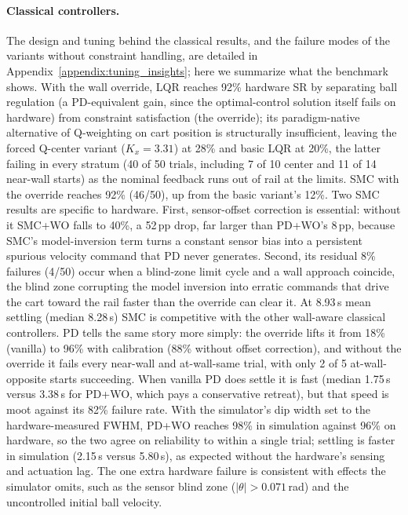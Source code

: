 \paragraph{Classical controllers.}
The design and tuning behind the classical results, and the failure modes
of the variants without constraint handling, are detailed in
Appendix~\ref{appendix:tuning_insights}; here we summarize what the benchmark
shows. With the wall override, LQR reaches 92\% hardware SR by separating
ball regulation (a PD-equivalent gain, since the optimal-control solution
itself fails on hardware) from constraint satisfaction (the
override); its paradigm-native alternative of Q-weighting on cart position is
structurally insufficient, leaving the forced Q-center variant
($K_x = 3.31$) at 28\% and basic LQR at 20\%, the latter failing in every
stratum (40 of 50 trials, including 7 of 10 center and 11 of 14 near-wall
starts) as the
nominal feedback runs out of rail at the limits. SMC with the override reaches 92\% (46/50), up from the basic
variant's 12\%. Two SMC results are specific to hardware. First, sensor-offset
correction is essential: without it SMC+WO falls to 40\%, a 52\,pp drop, far
larger than PD+WO's 8\,pp, because SMC's model-inversion term turns a constant
sensor bias into a persistent spurious velocity command that PD never
generates. Second, its residual 8\% failures (4/50) occur when a blind-zone
limit cycle and a wall approach coincide, the blind zone corrupting the model
inversion into erratic commands that drive the cart toward the rail faster
than the override can clear it. At 8.93\,s mean settling (median 8.28\,s) SMC
is competitive with the other wall-aware classical controllers. PD tells the
same story more simply: the override lifts it from 18\% (vanilla) to 96\% with
calibration (88\% without offset correction), and without the override it
fails every near-wall and at-wall-same trial, with only 2 of 5
at-wall-opposite starts succeeding. When vanilla PD does settle it is
fast (median 1.75\,s versus 3.38\,s for PD+WO, which pays a conservative
retreat), but that speed is moot against its 82\% failure rate. With the
simulator's dip width set to the hardware-measured FWHM, PD+WO reaches 98\% in
simulation against 96\% on hardware, so the two agree on reliability to within a
single trial; settling is faster in simulation (2.15\,s versus 5.80\,s), as
expected without the hardware's sensing and actuation lag. The one extra
hardware failure is consistent with effects the simulator omits, such as the
sensor blind zone ($|\theta| > 0.071$\,rad) and the uncontrolled initial ball
velocity.


